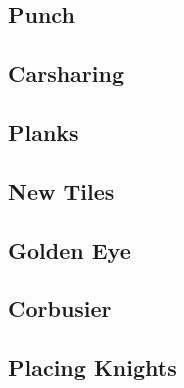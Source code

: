 \documentclass[10pt,a4paper,twoside]{report}
\begin{document}
\newpage
\subsection*{Punch}
\begin{keywords}\end{keywords}


\newpage
\subsection*{Carsharing}
\begin{keywords}\end{keywords}


\newpage
\subsection*{Planks}
\begin{keywords}\end{keywords}



\newpage
\subsection*{New Tiles}
\begin{keywords}\end{keywords}


\newpage
\subsection*{Golden Eye}
\begin{keywords}\end{keywords}


\newpage
\subsection*{Corbusier}
\begin{keywords}\end{keywords}


\newpage
\subsection*{Placing Knights}
\begin{keywords}\end{keywords}

\end{document}
